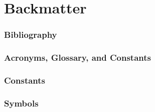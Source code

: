 \documentclass{beamer}
\begin{document}
    \section{Backmatter}
        \begin{frame}
            \frametitle{Bibliography}
            \printbibliography
        \end{frame}
        \begin{frame}
            \frametitle{Acronyms, Glossary, and Constants}
            \printglossary[type=\acronymtype]
            \printglossary[type=main]
        \end{frame}
        \begin{frame}
            \frametitle{Constants}
            \printglossary[type=constants, nonumberlist, nopostdot]
        \end{frame}
        \begin{frame}
            \frametitle{Symbols}
            \printglossary[type=symbols]
        \end{frame}
\end{document}
